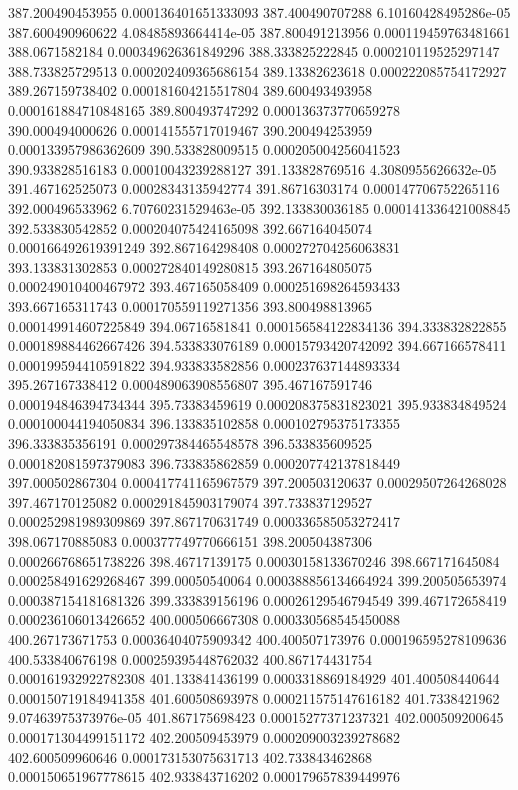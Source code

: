{387.200490453955 0.000136401651333093
387.400490707288 6.10160428495286e-05
387.600490960622 4.08485893664414e-05
387.800491213956 0.000119459763481661
388.0671582184 0.000349626361849296
388.333825222845 0.000210119525297147
388.733825729513 0.000202409365686154
389.13382623618 0.000222085754172927
389.267159738402 0.000181604215517804
389.600493493958 0.000161884710848165
389.800493747292 0.000136373770659278
390.000494000626 0.000141555717019467
390.200494253959 0.000133957986362609
390.533828009515 0.000205004256041523
390.933828516183 0.00010043239288127
391.133828769516 4.3080955626632e-05
391.467162525073 0.00028343135942774
391.86716303174 0.000147706752265116
392.000496533962 6.70760231529463e-05
392.133830036185 0.000141336421008845
392.533830542852 0.000204075424165098
392.667164045074 0.000166492619391249
392.867164298408 0.000272704256063831
393.133831302853 0.000272840149280815
393.267164805075 0.000249010400467972
393.467165058409 0.000251698264593433
393.667165311743 0.000170559119271356
393.800498813965 0.000149914607225849
394.06716581841 0.000156584122834136
394.333832822855 0.000189884462667426
394.533833076189 0.00015793420742092
394.667166578411 0.000199594410591822
394.933833582856 0.000237637144893334
395.267167338412 0.000489063908556807
395.467167591746 0.000194846394734344
395.73383459619 0.000208375831823021
395.933834849524 0.000100044194050834
396.133835102858 0.000102795375173355
396.333835356191 0.000297384465548578
396.533835609525 0.000182081597379083
396.733835862859 0.000207742137818449
397.000502867304 0.000417741165967579
397.200503120637 0.00029507264268028
397.467170125082 0.000291845903179074
397.733837129527 0.000252981989309869
397.867170631749 0.000336585053272417
398.067170885083 0.000377749770666151
398.200504387306 0.000266768651738226
398.46717139175 0.00030158133670246
398.667171645084 0.000258491629268467
399.00050540064 0.000388856134664924
399.200505653974 0.000387154181681326
399.333839156196 0.00026129546794549
399.467172658419 0.000236106013426652
400.000506667308 0.000330568545450088
400.267173671753 0.00036404075909342
400.400507173976 0.000196595278109636
400.533840676198 0.000259395448762032
400.867174431754 0.000161932922782308
401.133841436199 0.0003318869184929
401.400508440644 0.000150719184941358
401.600508693978 0.000211575147616182
401.7338421962 9.07463975373976e-05
401.867175698423 0.00015277371237321
402.000509200645 0.000171304499151172
402.200509453979 0.000209003239278682
402.600509960646 0.000173153075631713
402.733843462868 0.000150651967778615
402.933843716202 0.000179657839449976
}
